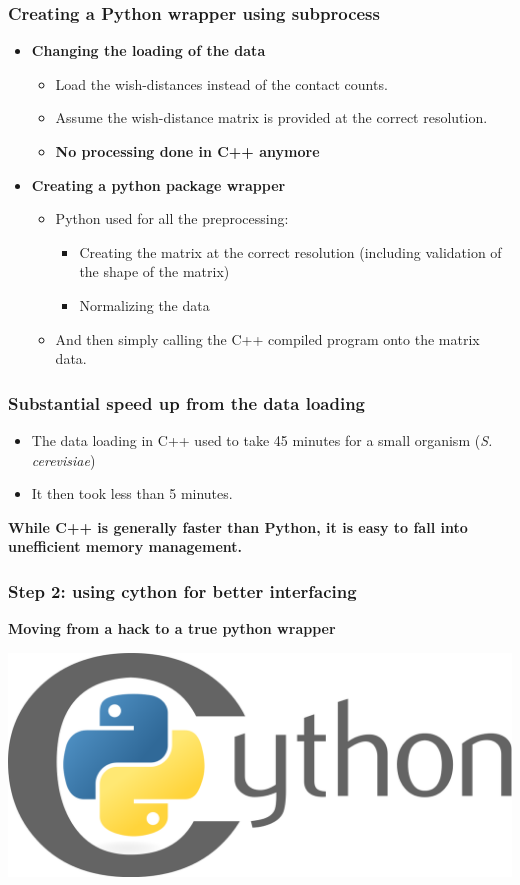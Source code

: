 \documentclass[xcolor=dvipsnames]{beamer}
\begin{document}
\begin{frame}
\frametitle{Creating a Python wrapper using subprocess}
\begin{itemize}
\item {\color{Blue} \bf Changing the loading of the data}
\begin{itemize}[label={$\bullet$}]
\item Load the wish-distances instead of the contact counts.
\item Assume the wish-distance matrix is provided at the correct resolution.
\item {\bf \color{Red} No processing done in C++ anymore}
\end{itemize}
\item {\color{Blue} \bf Creating a python package wrapper}
\begin{itemize}[label={$\bullet$}]
\item Python used for all the preprocessing:
\begin{itemize}[label={$\bullet$}]
\item Creating the matrix at the correct resolution (including validation of
the shape of the matrix)
\item Normalizing the data
\end{itemize}
\item And then simply calling the C++ compiled program onto the matrix data.
\end{itemize}
\end{itemize}
\end{frame}


\begin{frame}
\frametitle{Substantial speed up from the data loading}
\begin{itemize}[label={$\bullet$}]
\item The data loading in C++ used to take 45 minutes for a small organism
(\textit{S. cerevisiae})
\item It then took less than 5 minutes.
\end{itemize}

\vspace{3em}
{\color{Red} \bf While C++ is generally faster than Python, it is easy to fall
into unefficient memory management.}

\end{frame}

\begin{frame}
\frametitle{Step 2: using cython for better interfacing}

{\bf \color{Blue} Moving from a hack to a true python wrapper}

\vspace{4em}
\begin{center}
\includegraphics[width=0.3\linewidth]{images/cython.png}
\end{center}
\end{frame}
\end{document}
